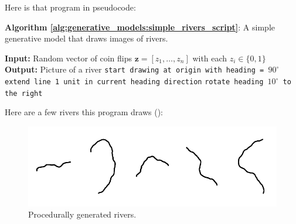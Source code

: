\newpage
Here is that program in pseudocode:
\begin{algorithm}[h]
\SetAlgoVlined
\DontPrintSemicolon
\caption{{\bf Algorithm \ref{alg:generative_models:simple_rivers_script}}: A simple generative model that draws images of rivers.}
\fakealgorithmcaption{}
\label{alg:generative_models:simple_rivers_script}
{\bf Input:} Random vector of coin flips $\mathbf{z} = [z_1, \ldots, z_{n}]$ with each $z_i \in \{0,1\}$\;
{\bf Output:} Picture of a river\;
\texttt{start drawing at origin with heading = $90^\circ$}\;
 {
    \texttt{extend line 1 unit in current heading direction}\;
     {
        \texttt{rotate heading $10^\circ$ to the right}
    }
}
\end{algorithm}

Here are a few rivers this program draws (\fig{\ref{fig:generative_models:rivers1}}):
\begin{figure}[h]
    \centerline{
    \includegraphics[width=0.8\linewidth]{./figures/generative_models/G4_river.pdf}
    }
    \caption{Procedurally generated rivers.}
    \label{fig:generative_models:rivers1}
\end{figure}

